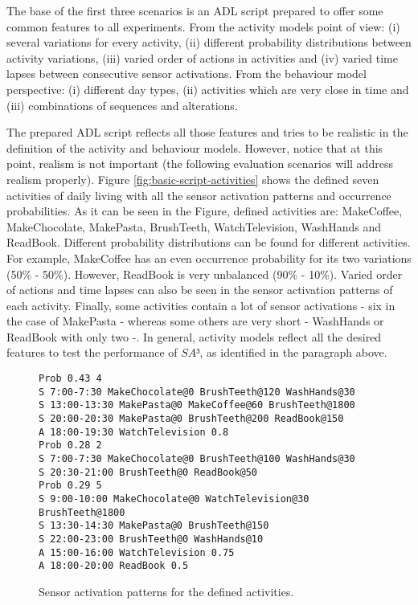 The base of the first three scenarios is an ADL script prepared to offer some common features to all experiments. From the activity models point of view: (i) several variations for every activity, (ii) different probability distributions between activity variations, (iii) varied order of actions in activities and (iv) varied time lapses between consecutive sensor activations. From the behaviour model perspective: (i) different day types, (ii) activities which are very close in time and (iii) combinations of sequences and alterations.

The prepared ADL script reflects all those features and tries to be realistic in the definition of the activity and behaviour models. However, notice that at this point, realism is not important (the following evaluation scenarios will address realism properly). Figure \ref{fig:basic-script-activities} shows the defined seven activities of daily living with all the sensor activation patterns and occurrence probabilities. As it can be seen in the Figure, defined activities are: MakeCoffee, MakeChocolate, MakePasta, BrushTeeth, WatchTelevision, WashHands and ReadBook. Different probability distributions can be found for different activities. For example, MakeCoffee has an even occurrence probability for its two variations (50\% - 50\%). However, ReadBook is very unbalanced (90\% - 10\%). Varied order of actions and time lapses can also be seen in the sensor activation patterns of each activity. Finally, some activities contain a lot of sensor activations - six in the case of MakePasta - whereas some others are very short - WashHands or ReadBook with only two -. In general, activity models reflect all the desired features to test the performance of $SA³$, as identified in the paragraph above.

\begin{figure}
\begin{small}
\lstset{linewidth=\textwidth}
\begin{lstlisting}
Prob 0.43 4
S 7:00-7:30 MakeChocolate@0 BrushTeeth@120 WashHands@30
S 13:00-13:30 MakePasta@0 MakeCoffee@60 BrushTeeth@1800
S 20:00-20:30 MakePasta@0 BrushTeeth@200 ReadBook@150
A 18:00-19:30 WatchTelevision 0.8
Prob 0.28 2
S 7:00-7:30 MakeChocolate@0 BrushTeeth@100 WashHands@30
S 20:30-21:00 BrushTeeth@0 ReadBook@50
Prob 0.29 5
S 9:00-10:00 MakeChocolate@0 WatchTelevision@30 BrushTeeth@1800
S 13:30-14:30 MakePasta@0 BrushTeeth@150
S 22:00-23:00 BrushTeeth@0 WashHands@10
A 15:00-16:00 WatchTelevision 0.75
A 18:00-20:00 ReadBook 0.5
\end{lstlisting}
\end{small}
\caption{Sensor activation patterns for the defined activities.}
\label{fig:basic-script-behaviour}
\end{figure}

